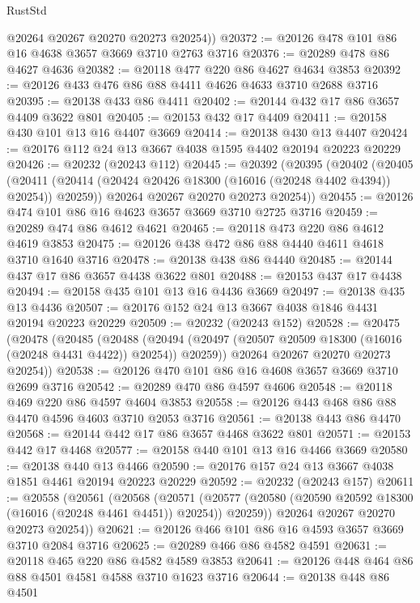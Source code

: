 \begin{lexlean}{RustStd}
\begin{coremodule}
        @20264
        @20267
        @20270
        @20273
        @20254))
@20372 := @20126 @478 @101 @86 @16 @4638 @3657 @3669 @3710 @2763 @3716
@20376 := @20289 @478 @86 @4627 @4636
@20382 := @20118 @477 @220 @86 @4627 @4634 @3853
@20392 := @20126 @433 @476 @86 @88 @4411 @4626 @4633 @3710 @2688 @3716
@20395 := @20138 @433 @86 @4411
@20402 := @20144 @432 @17 @86 @3657 @4409 @3622 @801
@20405 := @20153 @432 @17 @4409
@20411 := @20158 @430 @101 @13 @16 @4407 @3669
@20414 := @20138 @430 @13 @4407
@20424 := @20176 @112 @24 @13 @3667 @4038 @1595 @4402 @20194 @20223 @20229
@20426 := @20232 (@20243 @112)
@20445 := @20392
    (@20395
      (@20402
        (@20405
          (@20411 (@20414 (@20424 @20426 @18300 (@16016 (@20248 @4402 @4394)) @20254)) @20259))
        @20264
        @20267
        @20270
        @20273
        @20254))
@20455 := @20126 @474 @101 @86 @16 @4623 @3657 @3669 @3710 @2725 @3716
@20459 := @20289 @474 @86 @4612 @4621
@20465 := @20118 @473 @220 @86 @4612 @4619 @3853
@20475 := @20126 @438 @472 @86 @88 @4440 @4611 @4618 @3710 @1640 @3716
@20478 := @20138 @438 @86 @4440
@20485 := @20144 @437 @17 @86 @3657 @4438 @3622 @801
@20488 := @20153 @437 @17 @4438
@20494 := @20158 @435 @101 @13 @16 @4436 @3669
@20497 := @20138 @435 @13 @4436
@20507 := @20176 @152 @24 @13 @3667 @4038 @1846 @4431 @20194 @20223 @20229
@20509 := @20232 (@20243 @152)
@20528 := @20475
    (@20478
      (@20485
        (@20488
          (@20494 (@20497 (@20507 @20509 @18300 (@16016 (@20248 @4431 @4422)) @20254)) @20259))
        @20264
        @20267
        @20270
        @20273
        @20254))
@20538 := @20126 @470 @101 @86 @16 @4608 @3657 @3669 @3710 @2699 @3716
@20542 := @20289 @470 @86 @4597 @4606
@20548 := @20118 @469 @220 @86 @4597 @4604 @3853
@20558 := @20126 @443 @468 @86 @88 @4470 @4596 @4603 @3710 @2053 @3716
@20561 := @20138 @443 @86 @4470
@20568 := @20144 @442 @17 @86 @3657 @4468 @3622 @801
@20571 := @20153 @442 @17 @4468
@20577 := @20158 @440 @101 @13 @16 @4466 @3669
@20580 := @20138 @440 @13 @4466
@20590 := @20176 @157 @24 @13 @3667 @4038 @1851 @4461 @20194 @20223 @20229
@20592 := @20232 (@20243 @157)
@20611 := @20558
    (@20561
      (@20568
        (@20571
          (@20577 (@20580 (@20590 @20592 @18300 (@16016 (@20248 @4461 @4451)) @20254)) @20259))
        @20264
        @20267
        @20270
        @20273
        @20254))
@20621 := @20126 @466 @101 @86 @16 @4593 @3657 @3669 @3710 @2084 @3716
@20625 := @20289 @466 @86 @4582 @4591
@20631 := @20118 @465 @220 @86 @4582 @4589 @3853
@20641 := @20126 @448 @464 @86 @88 @4501 @4581 @4588 @3710 @1623 @3716
@20644 := @20138 @448 @86 @4501

\end{coremodule}
\end{lexlean}
